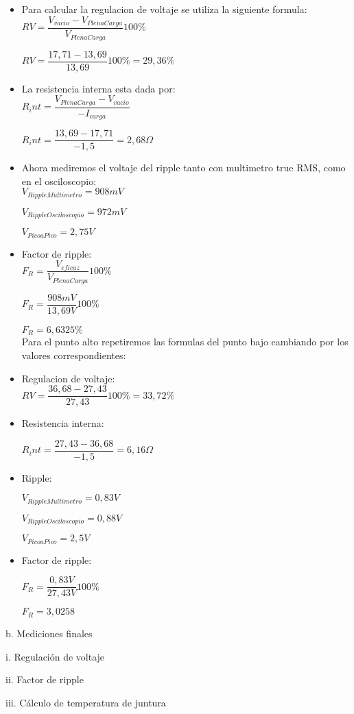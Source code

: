 \begin{itemize}

  \item Para calcular la regulacion de voltaje se utiliza la siguiente formula: \\

$RV = \dfrac{V_{vacio} - V_{PlenaCarga}}{V_{PlenaCarga}} 100\percent $

$RV = \dfrac{17,71 - 13,69}{13,69} 100\percent = 29,36\percent $\\

  \item La resistencia interna esta dada por: \\

$R_int = \dfrac{V_{PlenaCarga} - V_{vacio}}{-I_{carga}}$

$R_int = \dfrac{13,69 - 17,71}{-1,5} = 2,68\Omega $\\

  \item Ahora mediremos el voltaje del ripple tanto con multimetro true RMS, como en el osciloscopio: \\

$V_{RippleMultimetro} = 908 mV$

$V_{RippleOsciloscopio} = 972 mV$

$V_{PicoaPico} = 2,75 V$ \\

  \item Factor de ripple: \\

$F_R = \dfrac{V_{eficaz}}{V_{PlenaCarga}} 100\percent $

$F_R = \dfrac{908 mV}{13,69 V} 100\percent $

$F_R = 6,6325\percent $ \\

Para el punto alto repetiremos las formulas del punto bajo cambiando por los valores correspondientes: \\

  \item Regulacion de voltaje: \\

$RV = \dfrac{36,68 - 27,43}{27,43} 100\percent = 33,72\percent $\\

  \item Resistencia interna:

$R_int = \dfrac{27,43 - 36,68}{-1,5} = 6,16\Omega $\\

  \item Ripple:

$V_{RippleMultimetro} = 0,83 V$

$V_{RippleOsciloscopio} = 0,88 V$

$V_{PicoaPico} = 2,5 V$ \\

  \item Factor de ripple:

$F_R = \dfrac{0,83 V}{27,43 V} 100\percent $

$F_R = 3,0258 $ \\

\end{itemize}

b. Mediciones finales

i. Regulación de voltaje

ii. Factor de ripple

iii. Cálculo de temperatura de juntura
